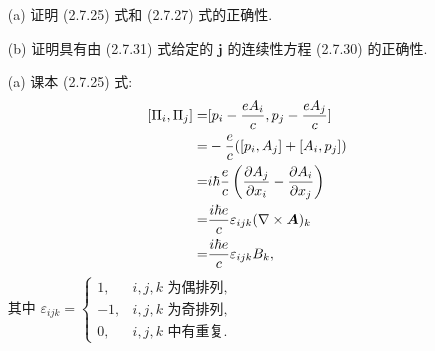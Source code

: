 \documentclass{assignment}
\begin{document}
\begin{prob}[课本习题 2.37]
    \begin{itemize}
        \item[(a)] 证明 (2.7.25) 式和 (2.7.27) 式的正确性.
        \item[(b)] 证明具有由 (2.7.31) 式给定的 $\bm{j}$ 的连续性方程 (2.7.30) 的正确性.
    \end{itemize}
\end{prob}
\begin{pf}
    \begin{itemize}
        \item[(a)] 课本 (2.7.25) 式:
        \begin{align}
            \notag[\Pi_i,\Pi_j]=&[p_i-\frac{eA_i}{c},p_j-\frac{eA_j}{c}]\\
            \notag=&-\frac{e}{c}([p_i,A_j]+[A_i,p_j])\\
            \notag=&i\hbar\frac{e}{c}\left(\frac{\partial A_j}{\partial x_i}-\frac{\partial A_i}{\partial x_j}\right)\\
            \notag=&\frac{i\hbar e}{c}\varepsilon_{ijk}(\nabla\times\bm{A})_k\\
            =&\frac{i\hbar e}{c}\varepsilon_{ijk}B_k,
        \end{align}
        其中 $\varepsilon_{ijk}=\left\{\begin{array}{ll}
            1,&i,j,k\text{ 为偶排列},\\
            -1,&i,j,k\text{ 为奇排列},\\
            0,&i,j,k\text{ 中有重复}.
        \end{array}\right.$


\end{itemize}
\end{pf}
\end{document}

